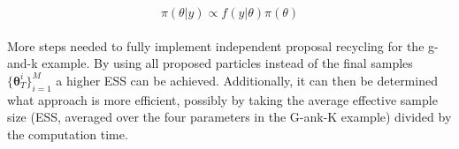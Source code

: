 \documentclass[12,fleqn]{article}
\theoremstyle{definition}
\theoremstyle{plain}
\begin{document}
\begin{equation}
\pi(\theta|y) \propto f(y|\theta) \pi(\theta)
\end{equation}

\paragraph{}
More steps needed to fully implement independent proposal recycling for the g-and-k example. By using all proposed particles instead of the final samples $\{ \boldsymbol{\theta}^i_T \}^M_{i=1}$ a higher ESS can be achieved. Additionally, it can then be determined what approach is more efficient, possibly by taking the average effective sample size (ESS, averaged over the four parameters in the G-ank-K example) divided by the computation time. 
\par


\appendix

%
\setlength{\bibleftmargin}{.125in}
\setlength{\bibindent}{-\bibleftmargin}


%
\end{document}
